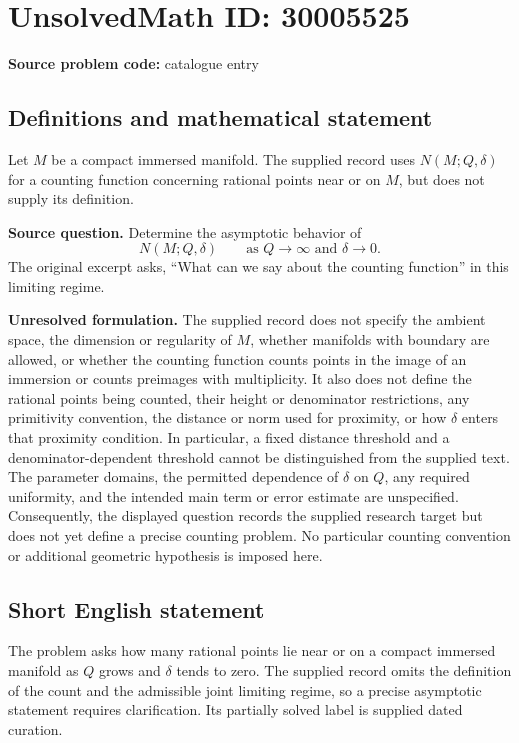 \documentclass[11pt]{article}
\begin{document}
\section*{UnsolvedMath ID: 30005525}
\textbf{Source problem code:} catalogue entry
\subsection{Definitions and mathematical statement}
Let \(M\) be a compact immersed manifold. The supplied record uses \(N(M;Q,\delta)\) for a counting function concerning rational points near or on \(M\), but does not supply its definition.

\textbf{Source question.} Determine the asymptotic behavior of
\[
N(M;Q,\delta)\qquad\text{as }Q\to\infty\text{ and }\delta\to 0.
\]
The original excerpt asks, ``What can we say about the counting function'' in this limiting regime.

\textbf{Unresolved formulation.} The supplied record does not specify the ambient space, the dimension or regularity of \(M\), whether manifolds with boundary are allowed, or whether the counting function counts points in the image of an immersion or counts preimages with multiplicity. It also does not define the rational points being counted, their height or denominator restrictions, any primitivity convention, the distance or norm used for proximity, or how \(\delta\) enters that proximity condition. In particular, a fixed distance threshold and a denominator-dependent threshold cannot be distinguished from the supplied text. The parameter domains, the permitted dependence of \(\delta\) on \(Q\), any required uniformity, and the intended main term or error estimate are unspecified. Consequently, the displayed question records the supplied research target but does not yet define a precise counting problem. No particular counting convention or additional geometric hypothesis is imposed here.
\subsection{Short English statement}
The problem asks how many rational points lie near or on a compact immersed manifold as \(Q\) grows and \(\delta\) tends to zero. The supplied record omits the definition of the count and the admissible joint limiting regime, so a precise asymptotic statement requires clarification. Its partially solved label is supplied dated curation.
\end{document}
